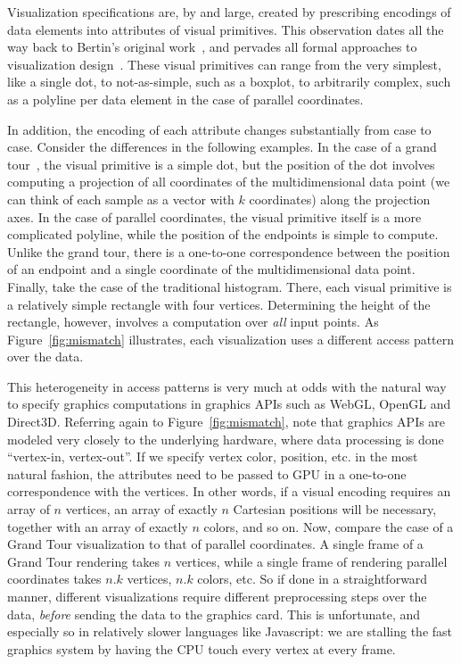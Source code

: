 Visualization specifications are, by and large, created by prescribing
encodings of data elements into attributes of visual primitives. This
observation dates all the way back to Bertin's original
work~\cite{Bertin:1967:SOG}, and pervades all formal approaches to
visualization design~\cite{Wickham:2009:GEG,Wilkinson:2005:TGO}. These
visual primitives can range from the very simplest, like a single dot,
to not-as-simple, such as a boxplot, to arbitrarily complex, such as
a polyline per data element in the case of parallel coordinates. 

In addition, the encoding of each attribute changes substantially from
case to case. Consider the differences in the following examples.  In
the case of a grand tour~\cite{Asimov:1985:TGT}, the visual primitive
is a simple dot, but the position of the dot involves computing a
projection of all coordinates of the multidimensional data point
(we can think of each sample as a vector with $k$ coordinates) along
the projection axes. In the case of parallel coordinates, the visual
primitive itself is a more complicated polyline, while the position of
the endpoints is simple to compute. Unlike the grand tour, there is a one-to-one
correspondence between the position of an endpoint and a single
coordinate of the multidimensional data point.  Finally, take the case
of the traditional histogram. There, each visual primitive is a
relatively simple rectangle with four vertices. Determining the height
of the rectangle, however, involves a computation
over \emph{all} input points. As Figure~\ref{fig:mismatch}
illustrates, each visualization uses a different access pattern over
the data.

This heterogeneity in access patterns is very much at
odds with the natural way to specify graphics computations in graphics
APIs such as WebGL, OpenGL and Direct3D. Referring again to
Figure~\ref{fig:mismatch}, note that graphics APIs are modeled very
closely to the underlying hardware, where data processing is done
``vertex-in, vertex-out''. If we specify vertex color, position,
etc. in the most natural fashion, the attributes need to be passed to
GPU in a one-to-one correspondence with the vertices. In other words,
if a visual encoding requires an array of $n$ vertices, an array of
exactly $n$ Cartesian positions will be necessary, together with an
array of exactly $n$ colors, and so on. Now, compare the case of a
Grand Tour visualization to that of parallel coordinates. A single
frame of a Grand Tour rendering takes $n$ vertices, while a single
frame of rendering parallel coordinates takes $n.k$ vertices, $n.k$
colors, etc. So if done in a straightforward manner, different
visualizations require different preprocessing steps over the
data, \emph{before} sending the data to the graphics card. This is
unfortunate, and especially so in relatively slower languages like
Javascript: we are stalling the fast graphics system by having the
CPU touch every vertex at every frame.

